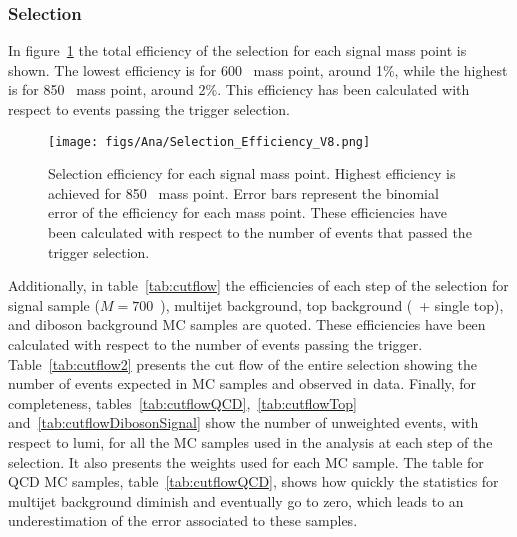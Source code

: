 \subsubsection{Selection}
\label{sec:seleff}

In figure~\ref{fig:MPEff} the total efficiency of the selection for each signal mass point is shown. The lowest efficiency is for 600 \GeVcc~mass point, around 1\%, while the highest is for 850 \GeVcc~mass point, around 2\%. This efficiency has been calculated with respect to events passing the trigger selection.  

\begin{figure}[!Hhtbp]
  \begin{center}
    \texttt{[image: figs/Ana/Selection\_Efficiency\_V8.png]}
    \caption{Selection efficiency for each signal mass point. Highest efficiency is achieved for 850 \GeVcc~mass point. Error bars represent the binomial error of the efficiency for each mass point. These efficiencies have been calculated with respect to the number of events that passed the trigger selection.}
    \label{fig:MPEff}
  \end{center}
\end{figure}

Additionally, in table~\ref{tab:cutflow} the efficiencies of each step of the selection for signal sample (${M=700}$~\GeVcc), multijet background, top background (\ttbar~+ single top), and diboson background MC samples are quoted. These efficiencies have been calculated with respect to the number of events passing the trigger. Table~\ref{tab:cutflow2} presents the cut flow of the entire selection showing the number of events expected in MC samples and observed in data. Finally, for completeness, tables~\ref{tab:cutflowQCD},~\ref{tab:cutflowTop} and~\ref{tab:cutflowDibosonSignal} show the number of unweighted events, with respect to lumi, for all the MC samples used in the analysis at each step of the selection. It also presents the weights used for each MC sample. The table for QCD MC samples, table~\ref{tab:cutflowQCD}, shows how quickly the statistics for multijet background diminish and eventually go to zero, which leads to an underestimation of the error associated to these samples. 

